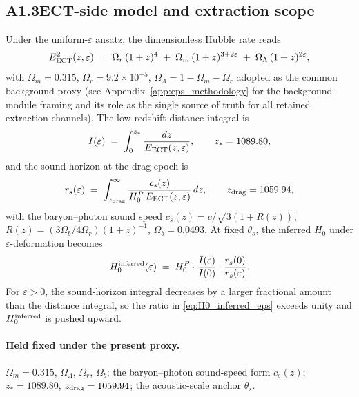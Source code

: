 \subsection*{A1.3\quad ECT-side model and extraction scope}

Under the uniform-$\varepsilon$ ansatz, the dimensionless Hubble rate
reads
\begin{equation}
E_{\rm ECT}^2(z,\varepsilon)
\;=\; \Omega_r\,(1+z)^4
\;+\; \Omega_m\,(1+z)^{3+2\varepsilon}
\;+\; \Omega_\Lambda\,(1+z)^{2\varepsilon},
\label{eq:eps_friedmann_A1}
\end{equation}
with $\Omega_m = 0.315$, $\Omega_r = 9.2 \times 10^{-5}$,
$\Omega_\Lambda = 1 - \Omega_m - \Omega_r$ adopted as the common
background proxy (see Appendix~\ref{app:eps_methodology} for the
background-module framing and its role as the single source of
truth for all retained extraction channels). The low-redshift
distance integral is
\begin{equation}
I(\varepsilon) \;=\; \int_0^{z_*}
\frac{dz}{E_{\rm ECT}(z,\varepsilon)},
\qquad z_* = 1089.80,
\end{equation}
and the sound horizon at the drag epoch is
\begin{equation}
r_s(\varepsilon)
\;=\; \int_{z_{\rm drag}}^{\infty}
\frac{c_s(z)}{H_0^P\,E_{\rm ECT}(z,\varepsilon)}\,dz,
\qquad z_{\rm drag} = 1059.94,
\end{equation}
with the baryon--photon sound speed
$c_s(z) = c/\sqrt{3(1+R(z))}$,
$R(z) = (3\Omega_b / 4\Omega_r)(1+z)^{-1}$, $\Omega_b = 0.0493$.
At fixed $\theta_s$, the inferred $H_0$ under
$\varepsilon$-deformation becomes
\begin{equation}
H_0^{\rm inferred}(\varepsilon)
\;=\; H_0^P \cdot
\frac{I(\varepsilon)}{I(0)}
\cdot
\frac{r_s(0)}{r_s(\varepsilon)}.
\label{eq:H0_inferred_eps}
\end{equation}
For $\varepsilon > 0$, the sound-horizon integral decreases by a
larger fractional amount than the distance integral, so the ratio
in \eqref{eq:H0_inferred_eps} exceeds unity and $H_0^{\rm inferred}$
is pushed upward.

\paragraph{Held fixed under the present proxy.}
$\Omega_m = 0.315$, $\Omega_\Lambda$, $\Omega_r$, $\Omega_b$; the
baryon--photon sound-speed form $c_s(z)$; $z_* = 1089.80$,
$z_{\rm drag} = 1059.94$; the acoustic-scale anchor $\theta_s$.


